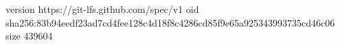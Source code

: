 version https://git-lfs.github.com/spec/v1
oid sha256:83b94eedf23ad7cd4fee128c4d18f8c4286cd85f9e65a925343993735cd46c06
size 439604
